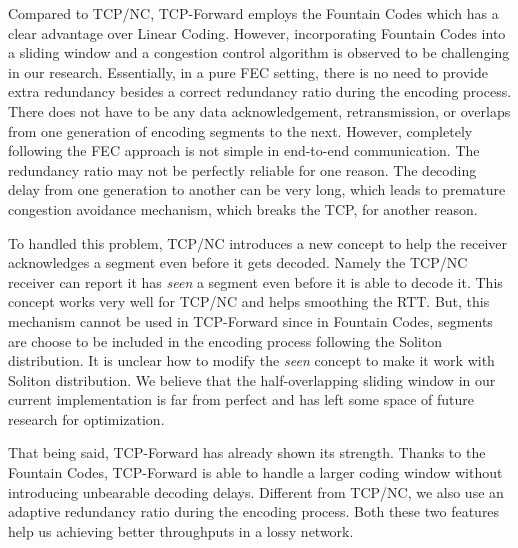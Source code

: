 \documentclass[10pt, conference, final, letterpaper]{IEEEtran}
\theoremstyle{definition}
\begin{document}
Compared to TCP/NC, TCP-Forward employs the Fountain Codes which has a clear advantage over Linear Coding. However, incorporating Fountain Codes into a sliding window and a congestion control algorithm is observed to be challenging in our research. Essentially, in a pure FEC setting, there is no need to provide extra redundancy besides a correct redundancy ratio during the encoding process. There does not have to be any data acknowledgement, retransmission, or overlaps from one generation of encoding segments to the next. However, completely following the FEC approach is not simple in end-to-end communication. The redundancy ratio may not be perfectly reliable for one reason. The decoding delay from one generation to another can be very long, which leads to premature congestion avoidance mechanism, which breaks the TCP, for another reason.

To handled this problem, TCP/NC introduces a new concept to help the receiver acknowledges a segment even before it gets decoded. Namely the TCP/NC receiver can report it has \textit{seen} a segment even before it is able to decode it. This concept works very well for TCP/NC and helps smoothing the RTT. But, this mechanism cannot be used in TCP-Forward since in Fountain Codes, segments are choose to be included in the encoding process following the Soliton distribution. It is unclear how to modify the \textit{seen} concept to make it work with Soliton distribution. We believe that the half-overlapping sliding window in our current implementation is far from perfect and has left some space of future research for optimization.

That being said, TCP-Forward has already shown its strength. Thanks to the Fountain Codes, TCP-Forward is able to handle a larger coding window without introducing unbearable decoding delays. Different from TCP/NC, we also use an adaptive redundancy ratio during the encoding process. Both these two features help us achieving better throughputs in a lossy network.



\end{document}
